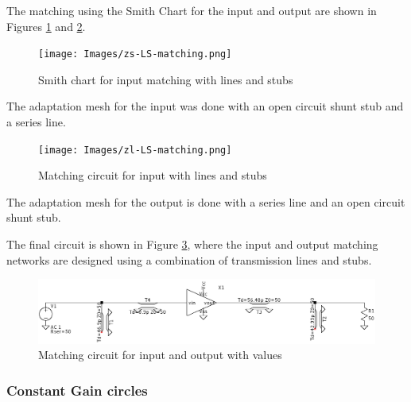 The matching using the Smith Chart for the input and output are shown in Figures \ref{fig:zs-line-matching} and \ref{fig:zl-line-matching}.

\begin{figure}[H]
    \centering
    \texttt{[image: Images/zs-LS-matching.png]}
    \caption{Smith chart for input matching with lines and stubs}
    \label{fig:zs-line-matching}
\end{figure}

The adaptation mesh for the input was done with an open circuit shunt stub and a series line. 

\begin{figure}[H]
    \centering
    \texttt{[image: Images/zl-LS-matching.png]}
    \caption{Matching circuit for input with lines and stubs}
    \label{fig:zl-line-matching}
\end{figure}

The adaptation mesh for the output is done with a series line and an open circuit shunt stub.

The final circuit is shown in Figure \ref{fig:MatchingCircuit-line}, where the input and output matching networks are designed using a combination of transmission lines and stubs.

\begin{figure}[H]
    \centering
    \includegraphics[width=1\textwidth]{Images/LS_matching-circuit.png}
    \caption{Matching circuit for input and output with values}
    \label{fig:MatchingCircuit-line}
\end{figure}

\subsubsection{Constant Gain circles}

